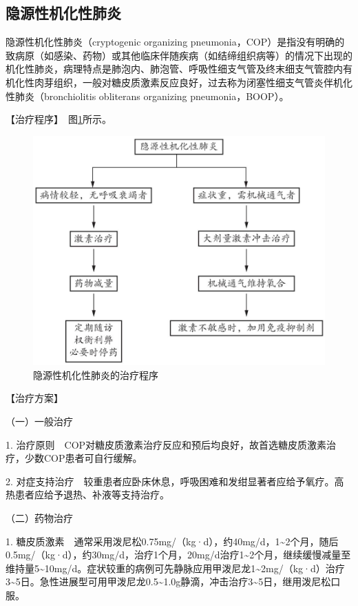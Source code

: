 \subsection{隐源性机化性肺炎}

隐源性机化性肺炎（cryptogenic organizing
pneumonia，COP）是指没有明确的致病原（如感染、药物）或其他临床伴随疾病（如结缔组织病等）的情况下出现的机化性肺炎，病理特点是肺泡内、肺泡管、呼吸性细支气管及终末细支气管腔内有机化性肉芽组织，一般对糖皮质激素反应良好，过去称为闭塞性细支气管炎伴机化性肺炎（bronchiolitis
obliterans organizing pneumonia，BOOP）。

【治疗程序】　图\ref{fig1-14-2}所示。

\begin{figure}[!htbp]
 \centering
 \includegraphics{./images/Image00030.jpg}
 \captionsetup{justification=centering}
 \caption{隐源性机化性肺炎的治疗程序}
 \label{fig1-14-2}
  \end{figure} 

【治疗方案】

{（一）一般治疗}

1.
治疗原则　COP对糖皮质激素治疗反应和预后均良好，故首选糖皮质激素治疗，少数COP患者可自行缓解。

2.
对症支持治疗　较重患者应卧床休息，呼吸困难和发绀显著者应给予氧疗。高热患者应给予退热、补液等支持治疗。

{（二）药物治疗}

1.
糖皮质激素　通常采用泼尼松0.75mg/（kg·d），约40mg/d，1\textasciitilde{}2个月，随后0.5mg/（kg·d），约30mg/d，治疗1个月，20mg/d治疗1\textasciitilde{}2个月，继续缓慢减量至维持量5\textasciitilde{}10mg/d。症状较重的病例可先静脉应用甲泼尼龙1\textasciitilde{}2mg/（kg·d）治疗3\textasciitilde{}5日。急性进展型可用甲泼尼龙0.5\textasciitilde{}1.0g静滴，冲击治疗3\textasciitilde{}5日，继用泼尼松口服。

